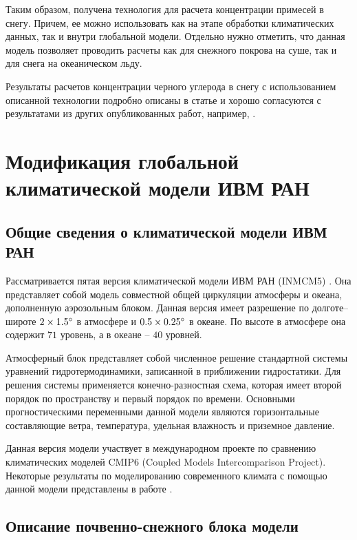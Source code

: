 \documentclass[a4paper, fontsize=14pt]{scrartcl}
\begin{document}
\newpage
Таким образом, получена технология для расчета концентрации примесей в снегу. Причем, ее можно использовать как на этапе обработки климатических данных, так и внутри глобальной модели. Отдельно нужно отметить, что данная модель позволяет проводить расчеты как для снежного покрова на суше, так и для снега на океаническом льду.

Результаты расчетов концентрации черного углерода в снегу с использованием описанной технологии подробно описаны в статье \cite{Chernenkov2021rus} и хорошо согласуются с результатами из других опубликованных работ, например, \cite{Flanner2007}.

\newpage
\section{Модификация глобальной климатической модели ИВМ РАН}

\subsection{Общие сведения о климатической модели ИВМ РАН}

Рассматривается пятая версия климатической модели ИВМ РАН (INMCM5) \cite{Volodin2017rus}. Она представляет собой модель совместной общей циркуляции атмосферы и океана, дополненную аэрозольным блоком. Данная версия имеет разрешение по долготе--широте $2 \times 1.5\degree$ в атмосфере и $0.5 \times 0.25\degree$ в океане. По высоте в атмосфере она содержит $71$ уровень, а в океане -- $40$ уровней. \sloppy

Атмосферный блок представляет собой численное решение стандартной системы уравнений гидротермодинамики, записанной в приближении гидростатики. Для решения системы применяется конечно-разностная схема, которая имеет второй порядок по пространству и первый порядок по времени. Основными прогностическими переменными данной модели являются горизонтальные составляющие ветра, температура, удельная влажность и приземное давление. 

Данная версия модели участвует в международном проекте по сравнению климатических моделей CMIP6 (Coupled Models Intercomparison Project). Некоторые результаты по моделированию современного климата с помощью данной модели представлены в работе \cite{Volodin2017rus}.  \sloppy 


\subsection{Описание почвенно-снежного блока модели}
\end{document}

